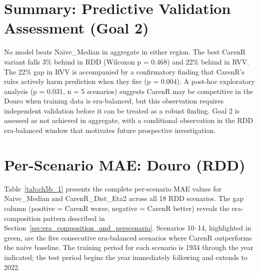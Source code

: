 \section{Summary: Predictive Validation Assessment (Goal 2)}\label{sec:summary_of_goal_2}

No model beats Naive\_Median in aggregate in either region. The best CarenR variant falls 3\% behind in RDD (Wilcoxon p = 0.468) and 22\% behind in RVV. The 22\% gap in RVV is accompanied by a confirmatory finding that CarenR's rules actively harm prediction when they fire (p = 0.004). A post-hoc exploratory analysis (p = 0.031, n = 5 scenarios) suggests CarenR may be competitive in the Douro when training data is era-balanced, but this observation requires independent validation before it can be treated as a robust finding. Goal 2 is assessed as not achieved in aggregate, with a conditional observation in the RDD era-balanced window that motivates future prospective investigation.




\section{Per-Scenario MAE: Douro (RDD)}\label{sec:perscenario_mae_douro_rdd}

Table~\ref{tab:ch5b_1} presents the complete per-scenario MAE values for Naive\_Median and CarenR\_Dist\_Eta2 across all 18 RDD scenarios. The gap column (positive = CarenR worse, negative = CarenR better) reveals the era-composition pattern described in Section~\ref{sec:era_composition_and_perscenario}. Scenarios 10--14, highlighted in green, are the five consecutive era-balanced scenarios where CarenR outperforms the naive baseline. The training period for each scenario is 1934 through the year indicated; the test period begins the year immediately following and extends to 2022.

